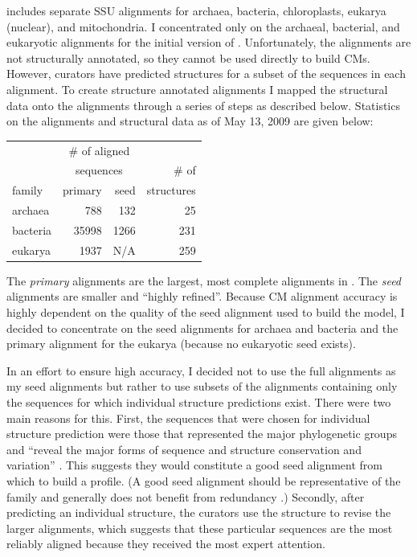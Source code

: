  includes separate SSU alignments for archaea, bacteria,
chloroplasts, eukarya (nuclear), and mitochondria. I concentrated only
on the archaeal, bacterial, and eukaryotic alignments for the initial
version of .  Unfortunately, the  alignments
are not structurally annotated, so they cannot be used directly to
build CMs. However,  curators have predicted structures for a
subset of the sequences in each alignment.  To create structure
annotated alignments I mapped the structural data onto the alignments
through a series of steps as described below.  Statistics on the
 alignments and structural data as of May 13, 2009 are given
below:

\begin{center}
\begin{tabular}{l|rr|r}
       & \multicolumn{2}{c|}{\# of aligned}& \\
       & \multicolumn{2}{c|}{sequences}    & \# of \\ \cline {2-3}
family & primary & seed                   & structures \\ \hline
archaea&     788 &  132                   & 25 \\
bacteria&  35998 & 1266                   & 231 \\
eukarya&    1937 & N/A                    & 259 \\
\end{tabular}
\end{center}

The {\em primary} alignments are the largest, most complete alignments
in . The {\em seed} alignments are smaller and ``highly
refined''. Because CM alignment accuracy is highly dependent on the
quality of the seed alignment used to build the model, I decided to
concentrate on the seed alignments for archaea and bacteria and the
primary alignment for the eukarya (because no eukaryotic seed exists).

In an effort to ensure high accuracy, I decided not to
use the full  alignments as my seed alignments but rather to use
subsets of the alignments containing only the sequences for which
individual structure predictions exist.  There were two main reasons
for this. First, the sequences that were chosen for individual
structure prediction were those that represented the major
phylogenetic groups and ``reveal the major forms of sequence and
structure conservation and variation'' \cite{CannoneGutell02}. This
suggests they would constitute a good seed alignment from which to
build a profile. (A good seed alignment should be representative of
the family and generally does not benefit from redundancy
\cite{Durbin98}.) Secondly, after predicting an individual structure,
the  curators use the structure to revise the larger alignments,
which suggests that these particular sequences are the most reliably
aligned because they received the most expert attention.

